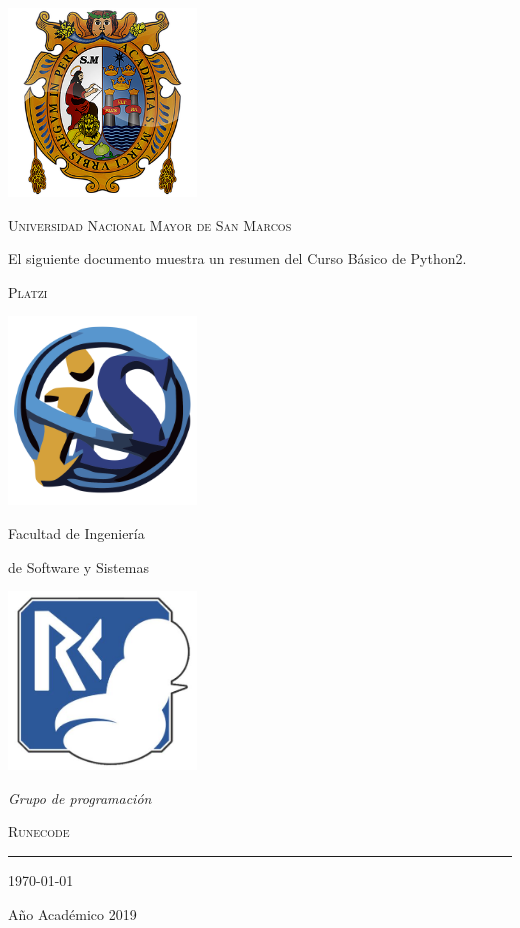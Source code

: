 \documentclass[a4paper,12pt]{book}
\begin{document}
\begin{titlepage}
	\vspace*{-3cm}
	\centering
		\includegraphics[width=5cm]{./escudo_UNMSM.png}
    

	{\scshape\LARGE Universidad Nacional Mayor de San Marcos\par}

	\vspace{1cm}

  {\large El siguiente documento muestra un resumen del Curso Básico de Python2.}

	\vspace{.1\textheight}
  { \LARGE \scshape Platzi}

	\vspace{.07\textheight}

	\parbox{.4\linewidth}{
			\includegraphics[width=5cm]{./escudo_FISI.png}\par
			{Facultad de Ingeniería\par
			de Software y Sistemas}
		}\hfill
	\parbox{.5\linewidth}{
		\raggedleft
			\includegraphics[width=5cm]{./captura.jpg}\par
			\emph{Grupo de programación}\par
			\textsc{Runecode}%
	}

		\vspace{.1\linewidth}

			\vfill

			\rule{.4\textwidth}{.4pt}

	{\large \today\par
	Año Académico 2019\par}

\end{titlepage}
\end{document}
